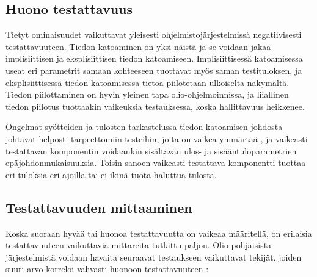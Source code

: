 \documentclass[finnish]{tktltiki2}
\theoremstyle{definition}
\theoremstyle{remark}
\begin{document}
\subsection{Huono testattavuus}

Tietyt ominaisuudet vaikuttavat yleisesti ohjelmistojärjestelmissä negatiivisesti testattavuuteen. Tiedon katoaminen on yksi näistä \citep[s. 20-22]{Voas:1995:STN:624607.625469} ja se voidaan jakaa implisiittisen ja eksplisiittisen tiedon katoamiseen. Implisiittisessä katoamisessa useat eri parametrit samaan kohteeseen tuottavat myös saman testituloksen, ja eksplisiittisessä tiedon katoamisessa tietoa piilotetaan ulkoiselta näkymältä. Tiedon piilottaminen on hyvin yleinen tapa olio-ohjelmoinnissa, ja liiallinen tiedon piilotus tuottaakin vaikeuksia testauksessa, koska hallittavuus heikkenee. 

Ongelmat syötteiden ja tulosten tarkastelussa tiedon katoamisen johdosta johtavat helposti tarpeettomiin testeihin, joita on vaikea ymmärtää \citep[s. 554]{Freedman:1991:TSC:126218.126229}, ja vaikeasti testattavan komponentin voidaankin sisältävän ulos- ja sisääntuloparametrien epäjohdonmukaisuuksia. Toisin sanoen vaikeasti testattava komponentti tuottaa eri tuloksia eri ajoilla tai ei ikinä tuota haluttua tulosta.   




\subsection{Testattavuuden mittaaminen} \label{testability_measure}



Koska suoraan hyvää tai huonoa testattavuutta on vaikeaa määritellä, on erilaisia testattavuuteen vaikuttavia mittareita tutkittu paljon. Olio-pohjaisista järjestelmistä voidaan havaita seuraavat testaukseen vaikuttavat tekijät, joiden suuri arvo korreloi vahvasti huonoon testattavuuteen \citep[s. 5]{Dubey:2011:AMM:2020976.2020983}:
\end{document}

